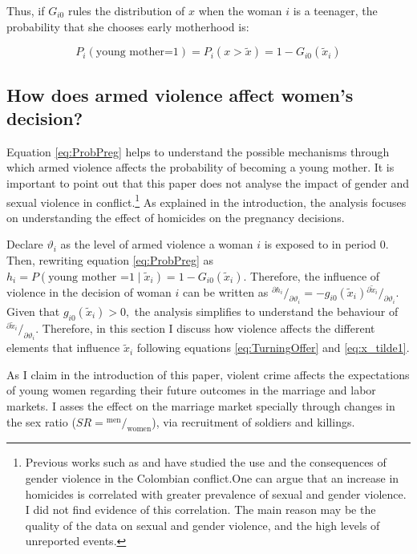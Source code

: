 \documentclass[a4paper,10pt,twocolumn,preprint,3p,authoryear]{elsarticle}
\newcommand*\rfrac[2]{{}^{#1}\!/_{#2}}
\begin{document}
Thus, if $G_{i0}$ rules the distribution of $x$ when the woman $i$ is a teenager, the probability that she chooses early motherhood is:

\begin{equation}
	P_{i}\left(\textrm{young mother=1}\right)=P_{i}\left(x > \tilde{x} \right)=1-G_{i0}\left(\tilde{x}_{i}\right)
	\label{eq:ProbPreg}
\end{equation}

\subsection{How does armed violence affect women's decision? \label{sec:DiscussVioOnPreg}}

Equation \ref{eq:ProbPreg} helps to understand the possible mechanisms through which armed violence affects the probability of becoming a young mother. It is important to point out that this paper does not analyse the impact of gender and sexual violence in conflict.\footnote{Previous works such as \citet{Lara2008} and \citet{Pinzon2009} have studied the use and the consequences of gender violence in the Colombian conflict.One can argue that an increase in homicides is correlated with greater prevalence of sexual and gender violence. I did not find evidence of this correlation. The main reason may be the quality of the data on sexual and gender violence, and the high levels of unreported events.} As  explained in the introduction, the analysis focuses on understanding the effect of homicides on the pregnancy decisions.

Declare $\vartheta_{i}$ as the level of armed violence a woman $i$ is exposed to in period $0$. Then, rewriting equation \ref{eq:ProbPreg} as $h_{i}=P\left(\textrm{young mother =1}\mid\tilde{x}_{i}\right) = 1-G_{i0}\left(\tilde{x}_{i}\right)$. Therefore, the influence of violence in the decision of woman $i$ can be written as $\rfrac{\partial h_{i}}{\partial \vartheta_{i}}=-g_{i0}\left(\tilde{x}_{i}\right)\rfrac{\partial\tilde{x}_{i}}{\partial \vartheta_{i}}.$ Given that $g_{i0}\left(\tilde{x}_{i}\right)>0,$ the analysis simplifies to understand the behaviour of  $\rfrac{\partial\tilde{x}_{i}}{\partial \vartheta_{i}}$. Therefore, in this section I discuss how violence affects the different elements that influence $\tilde{x}_{i}$ following equations \ref{eq:TurningOffer} and \ref{eq:x_tilde1}.

As I claim in the introduction of this paper, violent crime affects the expectations of young women regarding their future outcomes in the marriage and labor markets. I asses the effect on the marriage market specially through changes in the sex ratio ($SR=\rfrac{\textrm{men}}{\textrm{women}}$), via recruitment of soldiers and killings.  
\end{document}
